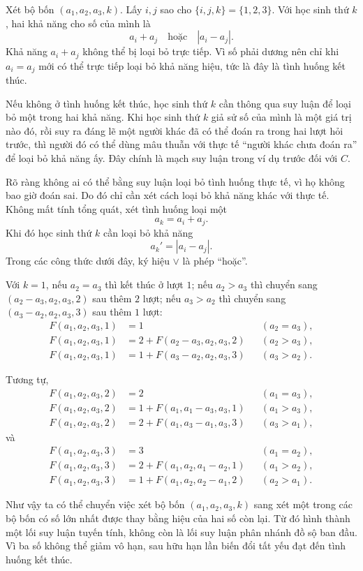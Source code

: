 \documentclass[11pt]{article}
\begin{document}
Xét bộ bốn \((a_1,a_2,a_3,k)\). Lấy \(i,j\) sao cho
\(\{i,j,k\}=\{1,2,3\}\). Với học sinh thứ \(k\), hai khả năng cho số của
mình là
\[
  a_i+a_j \quad\text{hoặc}\quad |a_i-a_j|.
\]
Khả năng \(a_i+a_j\) không thể bị loại bỏ trực tiếp. Vì số phải dương nên chỉ
khi \(a_i=a_j\) mới có thể trực tiếp loại bỏ khả năng hiệu, tức là đây là
tình huống kết thúc.

Nếu không ở tình huống kết thúc, học sinh thứ \(k\) cần thông qua suy luận để
loại bỏ một trong hai khả năng. Khi học sinh thứ \(k\) giả sử số của mình là
một giá trị nào đó, rồi suy ra đáng lẽ một người khác đã có thể đoán ra trong
hai lượt hỏi trước, thì người đó có thể dùng mâu thuẫn với thực tế ``người
khác chưa đoán ra'' để loại bỏ khả năng ấy. Đây chính là mạch suy luận trong
ví dụ trước đối với \(C\).

Rõ ràng không ai có thể bằng suy luận loại bỏ tình huống thực tế, vì họ không
bao giờ đoán sai. Do đó chỉ cần xét cách loại bỏ khả năng khác với thực tế.
Không mất tính tổng quát, xét tình huống loại một
\[
  a_k=a_i+a_j.
\]
Khi đó học sinh thứ \(k\) cần loại bỏ khả năng
\[
  a_k'=|a_i-a_j|.
\]
Trong các công thức dưới đây, ký hiệu \(\lor\) là phép ``hoặc''.

Với \(k=1\), nếu \(a_2=a_3\) thì kết thúc ở lượt \(1\); nếu \(a_2>a_3\) thì
chuyển sang \((a_2-a_3,a_2,a_3,2)\) sau thêm \(2\) lượt; nếu \(a_3>a_2\) thì
chuyển sang \((a_3-a_2,a_2,a_3,3)\) sau thêm \(1\) lượt:
\[
\begin{aligned}
F(a_1,a_2,a_3,1)&=1 &&(a_2=a_3),\\
F(a_1,a_2,a_3,1)&=2+F(a_2-a_3,a_2,a_3,2) &&(a_2>a_3),\\
F(a_1,a_2,a_3,1)&=1+F(a_3-a_2,a_2,a_3,3) &&(a_3>a_2).
\end{aligned}
\]

Tương tự,
\[
\begin{aligned}
F(a_1,a_2,a_3,2)&=2 &&(a_1=a_3),\\
F(a_1,a_2,a_3,2)&=1+F(a_1,a_1-a_3,a_3,1) &&(a_1>a_3),\\
F(a_1,a_2,a_3,2)&=2+F(a_1,a_3-a_1,a_3,3) &&(a_3>a_1),
\end{aligned}
\]
và
\[
\begin{aligned}
F(a_1,a_2,a_3,3)&=3 &&(a_1=a_2),\\
F(a_1,a_2,a_3,3)&=2+F(a_1,a_2,a_1-a_2,1) &&(a_1>a_2),\\
F(a_1,a_2,a_3,3)&=1+F(a_1,a_2,a_2-a_1,2) &&(a_2>a_1).
\end{aligned}
\]

Như vậy ta có thể chuyển việc xét bộ bốn
\((a_1,a_2,a_3,k)\) sang xét một trong các bộ bốn có số lớn nhất được thay
bằng hiệu của hai số còn lại. Từ đó hình thành một lối suy luận tuyến tính,
không còn là lối suy luận phân nhánh đồ sộ ban đầu. Vì ba số không thể giảm
vô hạn, sau hữu hạn lần biến đổi tất yếu đạt đến tình huống kết thúc.
\end{document}
